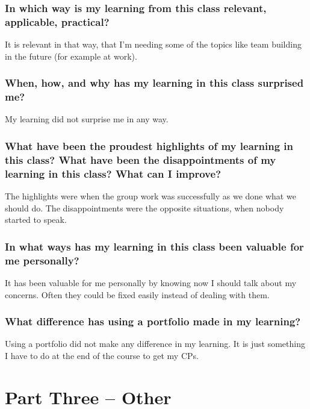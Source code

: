 \documentclass[11pt,fleqn]{book} %
\begin{document}
\section{In which way is my learning from this class relevant, applicable, practical?}
It is relevant in that way, that I'm needing some of the topics like team building in the future (for example at work).

\section{When, how, and why has my learning in this class surprised me?}
My learning did not surprise me in any way.

\section{What have been the proudest highlights of my learning in this class? What have been the disappointments of my learning in this class? What can I improve?}
The highlights were when the group work was successfully as we done what we should do.
The disappointments were the opposite situations, when nobody started to speak.

\section{In what ways has my learning in this class been valuable for me personally?}
It has been valuable for me personally by knowing now I should talk about my concerns. Often they could be fixed easily instead of dealing with them.

\section{What difference has using a portfolio made in my learning?}
Using a portfolio did not make any difference in my learning. It is just something I have to do at the end of the course to get my CPs.



\part{Part Three – Other}


\end{document}
